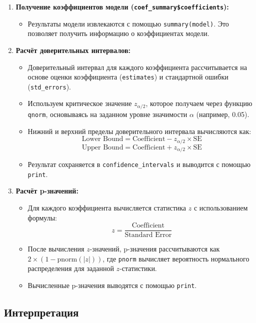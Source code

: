 \begin{enumerate}
	\item \textbf{Получение коэффициентов модели (\texttt{coef\_summary\$coefficients}):}
	\begin{itemize}
		\item Результаты модели извлекаются с помощью \texttt{summary(model)}. Это позволяет получить информацию о коэффициентах модели.
	\end{itemize}
	
	\item \textbf{Расчёт доверительных интервалов:}
	\begin{itemize}
		\item Доверительный интервал для каждого коэффициента рассчитывается на основе оценки коэффициента (\texttt{estimates}) и стандартной ошибки (\texttt{std\_errors}).
		\item Используем критическое значение \( z_{\alpha / 2} \), которое получаем через функцию \texttt{qnorm}, основываясь на заданном уровне значимости \( \alpha \) (например, 0.05).
		\item Нижний и верхний пределы доверительного интервала вычисляются как:
		\[
		\text{Lower Bound} = \text{Coefficient} - z_{\alpha/2} \times \text{SE}
		\]
		\[
		\text{Upper Bound} = \text{Coefficient} + z_{\alpha/2} \times \text{SE}
		\]
		\item Результат сохраняется в \texttt{confidence\_intervals} и выводится с помощью \texttt{print}.
	\end{itemize}
	
	\item \textbf{Расчёт p-значений:}
	\begin{itemize}
		\item Для каждого коэффициента вычисляется статистика \( z \) с использованием формулы:
		\[
		z = \frac{\text{Coefficient}}{\text{Standard Error}}
		\]
		\item После вычисления \( z \)-значений, p-значения рассчитываются как \( 2 \times (1 - \text{pnorm}(\left|z\right|)) \), где \texttt{pnorm} вычисляет вероятность нормального распределения для заданной \( z \)-статистики.
		\item Вычисленные p-значения выводятся с помощью \texttt{print}.
	\end{itemize}
\end{enumerate}

\subsection*{Интерпретация}

